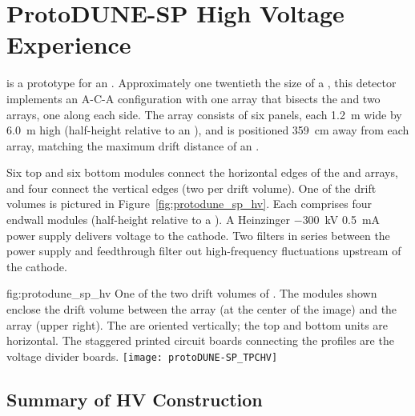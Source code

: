 \section{ProtoDUNE-SP High Voltage Experience}
\label{sec:fdsp-hv-protodune}



 \cite{Abi:2017aow} is a prototype for an . 
Approximately one twentieth the size of a , this detector implements an A-C-A configuration with one  array that bisects the  and two  arrays, one along each side. 
The  array consists of %
six  panels, each \SI{1.2}{m} wide by \SI{6.0}{m} high (half-height relative to an ), 
and is positioned \SI{359}{cm} away from each  array, matching the maximum drift distance of an .

Six top and six bottom  modules connect the horizontal edges of the  and  arrays, and four %
 connect the vertical edges (two per drift volume). One of the drift volumes is pictured in Figure~\ref{fig:protodune_sp_hv}. 
Each  comprises four endwall modules (half-height relative to a ).
A Heinzinger $-$\SI{300}{kV} \SI{0.5}{mA}  power supply delivers voltage to the cathode.
Two  filters in series between the power supply and  feedthrough filter out high-frequency fluctuations upstream of the cathode.

\begin{dunefigure}
{fig:protodune_sp_hv}
{One of the two drift volumes of . The  modules shown enclose the drift volume between the  array (at the center of the image) and the  array (upper right). The  are oriented vertically; the top and bottom units are horizontal. The staggered printed circuit boards connecting the  profiles are the voltage divider boards. %
}
\texttt{[image: protoDUNE-SP\_TPCHV]}
\end{dunefigure}

\subsection{Summary of HV Construction}
\label{sec:fdsp-hv-protodune-summary}

